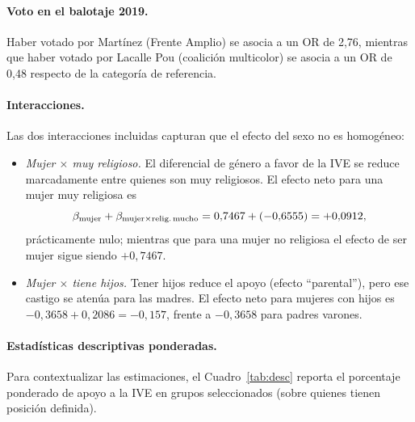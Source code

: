 \documentclass[11pt,a4paper]{article}
\begin{document}
\paragraph{Voto en el balotaje 2019.} Haber votado por Martínez (Frente Amplio) se asocia a un OR de 2,76, mientras que haber votado por Lacalle Pou (coalición multicolor) se asocia a un OR de 0,48 respecto de la categoría de referencia.

\paragraph{Interacciones.} Las dos interacciones incluidas capturan que el efecto del sexo no es homogéneo:
\begin{itemize}
\item \textit{Mujer $\times$ muy religioso.} El diferencial de género a favor de la IVE se reduce marcadamente entre quienes son muy religiosos. El efecto neto para una mujer muy religiosa es
\[
\beta_{\text{mujer}} + \beta_{\text{mujer}\times\text{relig.\,mucho}} = 0{,}7467 + (-0{,}6555) = +0{,}0912,
\]
prácticamente nulo; mientras que para una mujer no religiosa el efecto de ser mujer sigue siendo $+0{,}7467$.

\item \textit{Mujer $\times$ tiene hijos.} Tener hijos reduce el apoyo (efecto ``parental''), pero ese castigo se atenúa para las madres. El efecto neto para mujeres con hijos es $-0{,}3658 + 0{,}2086 = -0{,}157$, frente a $-0{,}3658$ para padres varones.
\end{itemize}

\paragraph{Estadísticas descriptivas ponderadas.} Para contextualizar las estimaciones, el Cuadro~\ref{tab:desc} reporta el porcentaje ponderado de apoyo a la IVE en grupos seleccionados (sobre quienes tienen posición definida).
\end{document}
